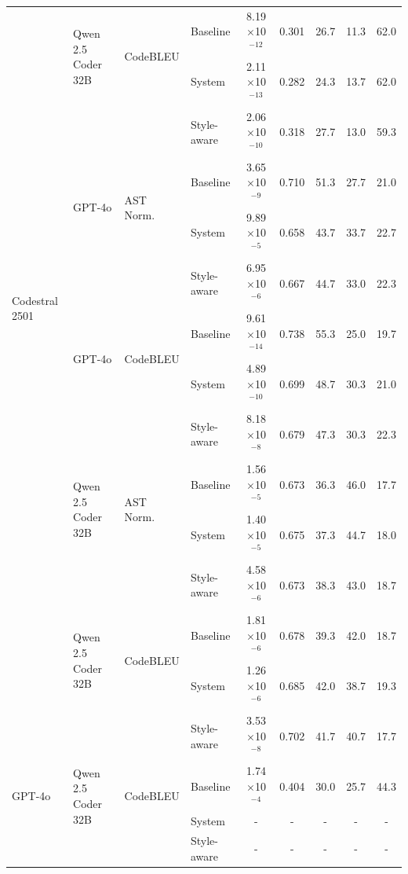 \begin{table}[h!]
{\begin{tabular}{|l|l|l|l|c|c|c|c|c|}
\cline{2-9}
& \multirow{2}{*}{Qwen 2.5 Coder 32B} & \multirow{2}{*}{CodeBLEU} & Baseline & 8.19$\times$10$^{-12}$ & 0.301 & 26.7 & 11.3 & 62.0 \\
\cline{4-9}
& & & System & 2.11$\times$10$^{-13}$ & 0.282 & 24.3 & 13.7 & 62.0 \\
\cline{4-9}
& & & Style-aware & 2.06$\times$10$^{-10}$ & 0.318 & 27.7 & 13.0 & 59.3 \\
\hline
\multirow{6}{*}{Codestral 2501} & \multirow{2}{*}{GPT-4o} & \multirow{2}{*}{AST Norm.} & Baseline & 3.65$\times$10$^{-9}$ & 0.710 & 51.3 & 27.7 & 21.0 \\
\cline{4-9}
& & & System & 9.89$\times$10$^{-5}$ & 0.658 & 43.7 & 33.7 & 22.7 \\
\cline{4-9}
& & & Style-aware & 6.95$\times$10$^{-6}$ & 0.667 & 44.7 & 33.0 & 22.3 \\
\cline{2-9}
& \multirow{2}{*}{GPT-4o} & \multirow{2}{*}{CodeBLEU} & Baseline & 9.61$\times$10$^{-14}$ & 0.738 & 55.3 & 25.0 & 19.7 \\
\cline{4-9}
& & & System & 4.89$\times$10$^{-10}$ & 0.699 & 48.7 & 30.3 & 21.0 \\
\cline{4-9}
& & & Style-aware & 8.18$\times$10$^{-8}$ & 0.679 & 47.3 & 30.3 & 22.3 \\
\cline{2-9}
& \multirow{2}{*}{Qwen 2.5 Coder 32B} & \multirow{2}{*}{AST Norm.} & Baseline & 1.56$\times$10$^{-5}$ & 0.673 & 36.3 & 46.0 & 17.7 \\
\cline{4-9}
& & & System & 1.40$\times$10$^{-5}$ & 0.675 & 37.3 & 44.7 & 18.0 \\
\cline{4-9}
& & & Style-aware & 4.58$\times$10$^{-6}$ & 0.673 & 38.3 & 43.0 & 18.7 \\
\cline{2-9}
& \multirow{2}{*}{Qwen 2.5 Coder 32B} & \multirow{2}{*}{CodeBLEU} & Baseline & 1.81$\times$10$^{-6}$ & 0.678 & 39.3 & 42.0 & 18.7 \\
\cline{4-9}
& & & System & 1.26$\times$10$^{-6}$ & 0.685 & 42.0 & 38.7 & 19.3 \\
\cline{4-9}
& & & Style-aware & 3.53$\times$10$^{-8}$ & 0.702 & 41.7 & 40.7 & 17.7 \\
\hline
\multirow{2}{*}{GPT-4o} & \multirow{2}{*}{Qwen 2.5 Coder 32B} & \multirow{2}{*}{CodeBLEU} & Baseline & 1.74$\times$10$^{-4}$ & 0.404 & 30.0 & 25.7 & 44.3 \\
\cline{4-9}
& & & System & - & - & - & - & - \\
\cline{4-9}
& & & Style-aware & - & - & - & - & - \\
\hline
\end{tabular}%
}
\end{table}

